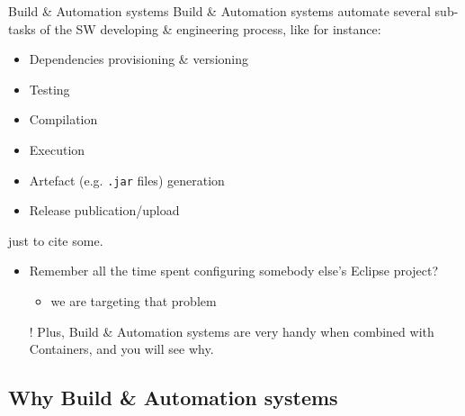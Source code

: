 \documentclass[handout]{beamer}\mode<presentation>{\usetheme{AMSCesenaBleu}}
\begin{document}
\begin{frame}{Build \& Automation systems}
    Build \& Automation systems \alert{automate} several sub-tasks of the SW developing \& engineering process, like for instance:
    \pause %
    \begin{multicols}{2}
    \begin{itemize}
        \item Dependencies provisioning \& versioning 
        \pause
        \item Testing 
        \pause
        \item \alert{Compilation} 
        \pause
        \item Execution 
        \pause
        \item Artefact (e.g. \texttt{.jar} files) generation
        \pause
        \item Release publication/upload
    \end{itemize}
    \end{multicols}
    just to cite some. 
    
    \vspace{.5cm}\pause
    
    \begin{itemize}
        
        \item Remember all the time spent configuring somebody else's Eclipse project?
        \begin{itemize}
            \item we are targeting that problem
        \end{itemize}
        
        \pause
        
        \item[!] Plus, Build \& Automation systems are very handy when combined with Containers, and you will see why.
        
    \end{itemize}
    
    
\end{frame}

\subsection{Why Build \& Automation systems}
\end{document}
